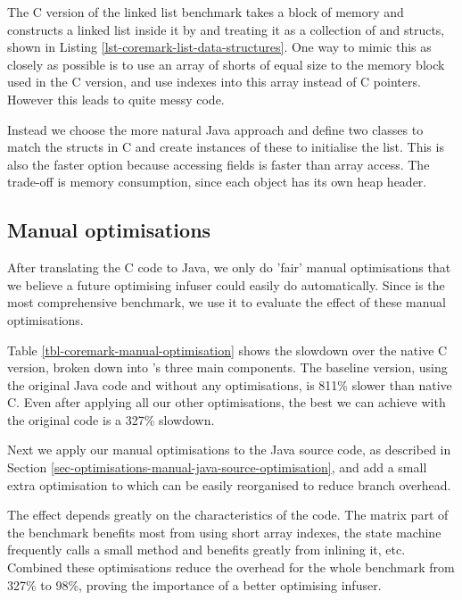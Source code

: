 The C version of the linked list benchmark takes a block of memory and constructs a linked list inside it by and treating it as a collection of  and  structs, shown in Listing \ref{lst-coremark-list-data-structures}. One way to mimic this as closely as possible is to use an array of shorts of equal size to the memory block used in the C version, and use indexes into this array instead of C pointers. However this leads to quite messy code.

Instead we choose the more natural Java approach and define two classes to match the structs in C and create instances of these to initialise the list. This is also the faster option because accessing fields is faster than array access. The trade-off is memory consumption, since each object has its own heap header.


\subsection{Manual optimisations}
\label{sec-evaluation-manual-optimisations}
After translating the C code to Java, we only do 'fair' manual optimisations that we believe a future optimising infuser could easily do automatically. Since  is the most comprehensive benchmark, we use it to evaluate the effect of these manual optimisations.



Table \ref{tbl-coremark-manual-optimisation} shows the slowdown over the native C version, broken down into 's three main components. The baseline version, using the original Java code and without any optimisations, is 811\% slower than native C. Even after applying all our other optimisations, the best we can achieve with the original code is a 327\% slowdown.

Next we apply our manual optimisations to the Java source code, as described in Section \ref{sec-optimisations-manual-java-source-optimisation}, and add a small extra optimisation to  which can be easily reorganised to reduce branch overhead.

The effect depends greatly on the characteristics of the code. The matrix part of the benchmark benefits most from using short array indexes, the state machine frequently calls a small method and benefits greatly from inlining it, etc. Combined these optimisations reduce the overhead for the whole benchmark from 327\% to 98\%, proving the importance of a better optimising infuser.

